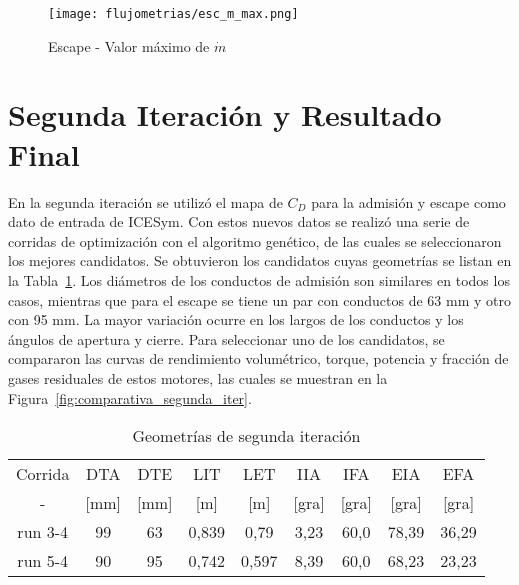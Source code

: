 \begin{figure}[h!]
    \centering
    \texttt{[image: flujometrias/esc\_m\_max.png]}
    \caption{Escape - Valor máximo de $\dot{m}$}\label{fig:esc_m_max}
\end{figure}


\section{Segunda Iteración y Resultado Final}
%
En la segunda iteración se utilizó el mapa de $C_D$ para la admisión y escape
como dato de entrada de ICESym.
%
Con estos nuevos datos se realizó una serie de corridas de optimización con el algoritmo
genético, de las cuales se seleccionaron los mejores candidatos.
%
Se obtuvieron los candidatos cuyas geometrías se listan en la
Tabla~\ref{tab:2iter_geom}.
%
Los diámetros de los conductos de admisión son similares en todos los casos,
mientras que para el escape se tiene un par con conductos de 63 mm y otro con
95 mm.
%
La mayor variación ocurre en los largos de los conductos y los ángulos de apertura y
cierre.
%
Para seleccionar uno de los candidatos, se compararon las curvas de rendimiento
volumétrico, torque, potencia y fracción de gases residuales de estos motores,
las cuales se muestran en la Figura~\ref{fig:comparativa_segunda_iter}.

\begin{table}[h!]
  \centering
  \begin{tabular}{ccccccccc}\toprule
    Corrida   & DTA   & DTE & LIT   & LET   & IIA   & IFA   & EIA    & EFA \\
    -         & [mm] & [mm] & [m]   & [m]   & [gra] & [gra] & [gra]  & [gra] \\ \midrule
    run 3-4   & 99   & 63   & 0,839 & 0,79  & 3,23 & 60,0   & 78,39  & 36,29 \\
    run 5-4   & 90   & 95   & 0,742 & 0,597 & 8,39 & 60,0   & 68,23  & 23,23 \\ \bottomrule
  \end{tabular}
  \caption{Geometrías de segunda iteración}\label{tab:2iter_geom}
\end{table}

